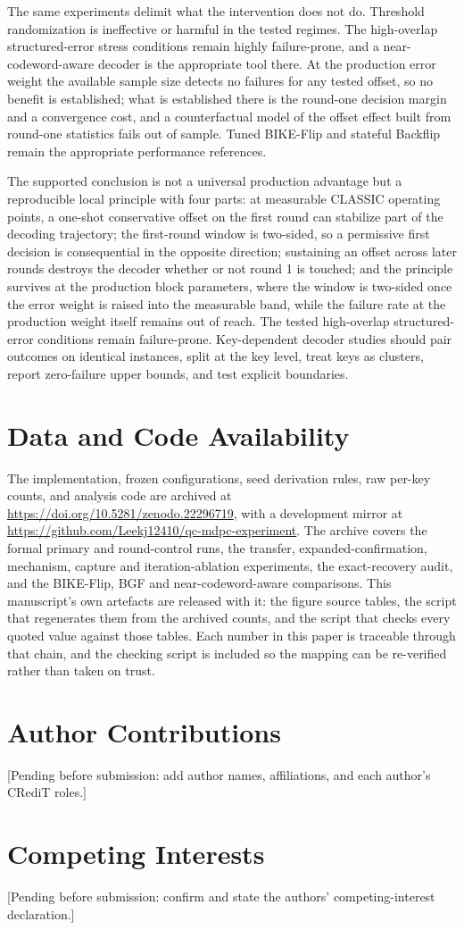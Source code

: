\documentclass[lettersize,journal]{IEEEtran}
\begin{document}
The same experiments delimit what the intervention does not do. Threshold randomization is ineffective or harmful in the tested regimes. The high-overlap structured-error stress conditions remain highly failure-prone, and a near-codeword-aware decoder is the appropriate tool there. At the production error weight the available sample size detects no failures for any tested offset, so no benefit is established; what is established there is the round-one decision margin and a convergence cost, and a counterfactual model of the offset effect built from round-one statistics fails out of sample. Tuned BIKE-Flip and stateful Backflip remain the appropriate performance references.

The supported conclusion is not a universal production advantage but a reproducible local principle with four parts: at measurable CLASSIC operating points, a one-shot conservative offset on the first round can stabilize part of the decoding trajectory; the first-round window is two-sided, so a permissive first decision is consequential in the opposite direction; sustaining an offset across later rounds destroys the decoder whether or not round 1 is touched; and the principle survives at the production block parameters, where the window is two-sided once the error weight is raised into the measurable band, while the failure rate at the production weight itself remains out of reach. The tested high-overlap structured-error conditions remain failure-prone. Key-dependent decoder studies should pair outcomes on identical instances, split at the key level, treat keys as clusters, report zero-failure upper bounds, and test explicit boundaries.

\section*{Data and Code Availability}
The implementation, frozen configurations, seed derivation rules, raw per-key counts, and analysis code are archived at \url{https://doi.org/10.5281/zenodo.22296719}, with a development mirror at \url{https://github.com/Leekj12410/qc-mdpc-experiment}. The archive covers the formal primary and round-control runs, the transfer, expanded-confirmation, mechanism, capture and iteration-ablation experiments, the exact-recovery audit, and the BIKE-Flip, BGF and near-codeword-aware comparisons. This manuscript's own artefacts are released with it: the figure source tables, the script that regenerates them from the archived counts, and the script that checks every quoted value against those tables. Each number in this paper is traceable through that chain, and the checking script is included so the mapping can be re-verified rather than taken on trust.

\section*{Author Contributions}
[Pending before submission: add author names, affiliations, and each author's CRediT roles.]

\section*{Competing Interests}
[Pending before submission: confirm and state the authors' competing-interest declaration.]



\end{document}
